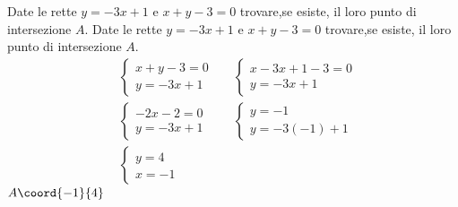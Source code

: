 \begin{exercise}
	Date le rette $y=-3x+1$ e $x+y-3=0$ trovare,se esiste, il loro punto di intersezione $A$. 
	\tcblower
	Date le rette $y=-3x+1$ e $x+y-3=0$ trovare,se esiste, il loro punto di intersezione $A$.
	\begin{align*}
		&\begin{cases}
			x+y-3=0\\
			y=-3x+1
		\end{cases}
		&&\begin{cases}
			x-3x+1-3=0\\
			y=-3x+1
		\end{cases}\\
		&\begin{cases}
			-2x-2=0\\
			y=-3x+1
		\end{cases}
		&&\begin{cases}
			y=-1\\
			y=-3(-1)+1
		\end{cases}\\
		&\begin{cases}
			y=4\\
			x=-1
		\end{cases}
	\end{align*}
	$A\coord{-1}{4}$
	\begin{center}
		
	\end{center}
\end{exercise}
